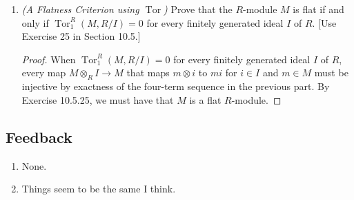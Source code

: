 \documentclass[11pt]{article}
\DeclareMathOperator{\Tor}{Tor}
\begin{document}
\begin{enumerate}
\begin{enumerate}
        \item \textit{(A Flatness Criterion using $\Tor$)} Prove that the $R$-module $M$ is flat if and only if $\Tor_1^R(M,R/I) = 0$ for every finitely generated ideal $I$ of $R$. [Use Exercise 25 in Section 10.5.] \begin{proof}
            When $\Tor_1^R(M,R/I) = 0$ for every finitely generated ideal $I$ of $R$, every map $M\otimes_R I\to M$ that maps $m\otimes i$ to $mi$ for $i\in I$ and $m\in M$ must be injective by exactness of the four-term sequence in the previous part. By Exercise 10.5.25, we must have that $M$ is a flat $R$-module.
        \end{proof}
    \end{enumerate}
\end{enumerate}
\subsection*{Feedback}
\begin{enumerate}
    \item None.
    \item Things seem to be the same I think.
\end{enumerate}
\end{document}
